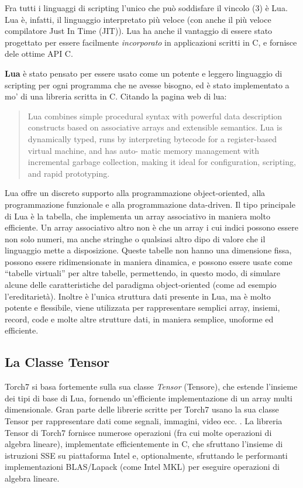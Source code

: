Fra tutti i linguaggi di scripting l'unico che pu\`o soddisfare il vincolo (3) \`e Lua.
Lua \`e, infatti, il linguaggio interpretato pi\`u veloce (con anche il pi\`u veloce compilatore Just In Time (JIT)).
Lua ha anche il vantaggio di essere stato progettato per essere facilmente \emph{incorporato} in applicazioni scritti in C, e fornisce dele ottime API C.

\textbf{Lua} \`e stato pensato per essere usato come un potente e leggero linguaggio di scripting per ogni programma che ne avesse bisogno, ed \`e stato implementato a mo' di una libreria scritta in C.
Citando la pagina web di lua:

\begin{quote}
Lua combines simple procedural syntax with powerful data description constructs based on associative arrays and extensible semantics. Lua is dynamically typed, runs by interpreting bytecode for a register-based virtual machine, and has auto- matic memory management with incremental garbage collection, making it ideal for configuration, scripting, and rapid prototyping.
\end{quote}

Lua offre un discreto supporto alla programmazione object-oriented, alla programmazione funzionale e alla programmazione data-driven.
Il tipo principale di Lua \`e la tabella, che implementa un array associativo in maniera molto efficiente.
Un array associativo altro non \`e che un array i cui indici possono essere non solo numeri, ma anche stringhe o qualsiasi altro dipo di valore che il linguaggio mette a disposizione.
Queste tabelle non hanno una dimensione fissa, possono essere ridimensionate in maniera dinamica, e possono essere usate come ``tabelle virtuali'' per altre tabelle, permettendo, in questo modo, di simulare alcune delle caratteristiche del paradigma object-oriented (come ad esempio l'ereditariet\`a).
Inoltre \`e l'unica struttura dati presente in Lua, ma \`e molto potente e flessibile, viene utilizzata per rappresentare semplici array, insiemi, record, code e molte altre strutture dati, in maniera semplice, unoforme ed efficiente.

\subsection{La Classe Tensor}
Torch7 si basa fortemente sulla sua classe \emph{Tensor} (Tensore), che estende l'insieme dei tipi di base di Lua, fornendo un'efficiente implementazione di un array multi dimensionale.
Gran parte delle librerie scritte per Torch7 usano la sua classe Tensor per rappresentare dati come segnali, immagini, video ecc. .
La libreria Tensor di Torch7 fornisce numerose operazioni (fra cui molte operazioni di algebra lineare), implementate efficientemente in C, che sfruttano l'insieme di istruzioni SSE su piattaforma Intel e, optionalmente, sfruttando le performanti implementazioni BLAS/Lapack (come Intel MKL) per eseguire operazioni di algebra lineare.

